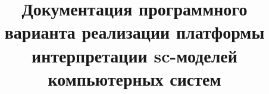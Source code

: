 \documentclass{scn/svmono}
\begin{document}
\DeactivateBG
\title{\centering
Документация программного варианта реализации платформы интерпретации sc-моделей компьютерных систем}
\author{}
\maketitle

\normalsize

\setcounter{page}{3}

\ActivateBG
\begin{SCn}

\end{SCn}
\end{document}
